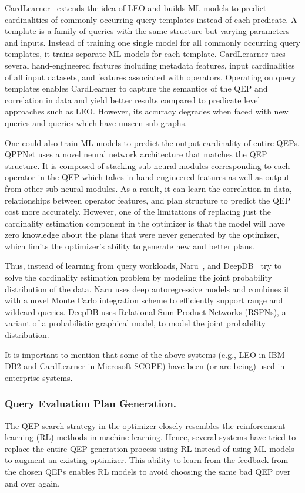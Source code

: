 CardLearner~\cite{cardlearner} extends the idea of LEO and builds ML models to predict cardinalities of commonly occurring query templates instead of each predicate.
A template is a family of queries with the same structure but varying parameters and inputs.
Instead of training one single model for all commonly occurring query templates, it trains separate ML models for each template.
CardLerarner uses several hand-engineered features including metadata features, input cardinalities of all input datasets, and features associated with operators.
Operating on query templates enables CardLearner to capture the semantics of the QEP and correlation in data and yield better results compared to predicate level approaches such as LEO.
However, its accuracy degrades when faced with new queries and queries which have unseen sub-graphs.


One could also train ML models to predict the output cardinality of entire QEPs.
QPPNet uses a novel neural network architecture that matches the QEP structure.
It is composed of stacking sub-neural-modules corresponding to each operator in the QEP which takes in hand-engineered features as well as output from other sub-neural-modules.
As a result, it can learn the correlation in data, relationships between operator features, and plan structure to predict the QEP cost more accurately.
However, one of the limitations of replacing just the cardinality estimation component in the optimizer is that the model will have zero knowledge about the plans that were never generated by the optimizer, which limits the optimizer's ability to generate new and better plans.

Thus, instead of learning from query workloads, Naru~\cite{naru}, and DeepDB~\cite{deepdb} try to solve the cardinality estimation problem by modeling the joint probability distribution of the data.
Naru uses deep autoregressive models and combines it with a novel Monte Carlo integration scheme to efficiently support range and wildcard queries.
DeepDB uses Relational Sum-Product Networks (RSPNs), a variant of a probabilistic graphical model, to model the joint probability distribution.

It is important to mention that some of the above systems (e.g., LEO in IBM DB2 and CardLearner in Microsoft SCOPE) have been (or are being) used in enterprise systems.

\subsubsection{Query Evaluation Plan Generation.} The QEP search strategy in the optimizer closely resembles the reinforcement learning (RL) methods in machine learning.
Hence, several systems have tried to replace the entire QEP generation process using RL instead of using ML models to augment an existing optimizer.
This ability to learn from the feedback from the chosen QEPs enables RL models to avoid choosing the same bad QEP over and over again.

